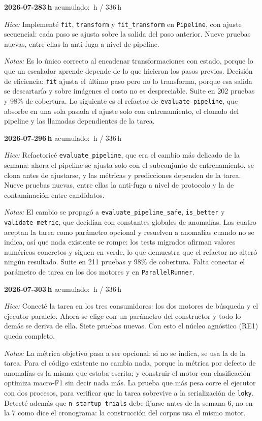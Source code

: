 \documentclass[11pt,letterpaper]{article}
\newcommand{\presupuesto}{336}
\newcommand{\horasacum}{0}
\newcommand{\entrada}[4]{%
  \xdef\horasacum{\fpeval{\horasacum + #2}}%
  \par\medskip
  \noindent\textbf{\color{tecnavy}#1}\quad\textbf{#2\,h}%
  \hfill{\small\color{gris}acumulado: \horasacum\,h / \presupuesto\,h}\par
  \nopagebreak
  \noindent\textit{Hice:} #3\par
  \nopagebreak
  \noindent\textit{Notas:} #4\par
}
\begin{document}
\entrada{2026-07-28}{3}
{Implementé \texttt{fit}, \texttt{transform} y \texttt{fit\_transform} en
 \texttt{Pipeline}, con ajuste secuencial: cada paso se ajusta sobre la salida del paso
 anterior. Nueve pruebas nuevas, entre ellas la anti-fuga a nivel de pipeline.}
{Es lo único correcto al encadenar transformaciones con estado, porque lo que un
 escalador aprende depende de lo que hicieron los pasos previos. Decisión de eficiencia:
 \texttt{fit} ajusta el último paso pero no lo transforma, porque esa salida se
 descartaría y sobre imágenes el costo no es despreciable. Suite en 202 pruebas y 98\% de
 cobertura. Lo siguiente es el refactor de \texttt{evaluate\_pipeline}, que absorbe en
 una sola pasada el ajuste solo con entrenamiento, el clonado del pipeline y las llamadas
 dependientes de la tarea.}

\entrada{2026-07-29}{6}
{Refactoricé \texttt{evaluate\_pipeline}, que era el cambio más delicado de la semana:
 ahora el pipeline se ajusta solo con el subconjunto de entrenamiento, se clona antes de
 ajustarse, y las métricas y predicciones dependen de la tarea. Nueve pruebas nuevas,
 entre ellas la anti-fuga a nivel de protocolo y la de contaminación entre candidatos.}
{El cambio se propagó a \texttt{evaluate\_pipeline\_safe}, \texttt{is\_better} y
 \texttt{validate\_metric}, que decidían con constantes globales de anomalías. Las cuatro
 aceptan la tarea como parámetro opcional y resuelven a anomalías cuando no se indica,
 así que nada existente se rompe: los tests migrados afirman valores numéricos concretos
 y siguen en verde, lo que demuestra que el refactor no alteró ningún resultado. Suite en
 211 pruebas y 98\% de cobertura. Falta conectar el parámetro de tarea en los dos motores
 y en \texttt{ParallelRunner}.}

\entrada{2026-07-30}{3}
{Conecté la tarea en los tres consumidores: los dos motores de búsqueda y el ejecutor
 paralelo. Ahora se elige con un parámetro del constructor y todo lo demás se deriva de
 ella. Siete pruebas nuevas. Con esto el núcleo agnóstico (RE1) queda completo.}
{La métrica objetivo pasa a ser opcional: si no se indica, se usa la de la tarea. Para el
 código existente no cambia nada, porque la métrica por defecto de anomalías es la misma
 que estaba escrita; y construir el motor con clasificación optimiza macro-F1 sin decir
 nada más. La prueba que más pesa corre el ejecutor con dos procesos, para verificar que
 la tarea sobrevive a la serialización de \texttt{loky}. Detecté además que
 \texttt{n\_startup\_trials} debe fijarse antes de la semana 6, no en la 7 como dice el
 cronograma: la construcción del corpus usa el mismo motor.}
\end{document}
